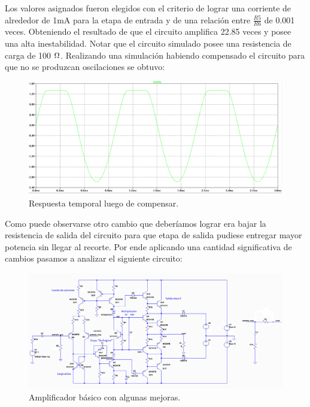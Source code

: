 Los valores asignados fueron elegidos con el criterio de lograr una corriente de alrededor de 1mA para la etapa de entrada y de una relación entre $\frac{R5}{R6}$  de 0.001 veces. Obteniendo el resultado de que el circuito amplifica 22.85 veces y posee una alta inestabilidad.
Notar que el circuito simulado posee una resistencia de carga de 100 $\ohm$. Realizando una simulación habiendo compensado el circuito para que no se produzcan oscilaciones se obtuvo:

\begin{figure}[H]
\centering
\includegraphics[width=\textwidth]{img/cir_basico_compensado.png}
\caption{Respuesta temporal luego de compensar.}
\end{figure}

Como puede observarse otro cambio que deberíamos lograr era bajar la resistencia de salida del circuito para que etapa de salida pudiese entregar mayor potencia sin llegar al recorte. Por ende aplicando una cantidad significativa de cambios pasamos a analizar el siguiente circuito:

\begin{figure}[H]
\centering
\includegraphics[width=\textwidth]{img/circuito_beta_mejorado.png}
\caption{Amplificador básico con algunas mejoras.}
\end{figure}

